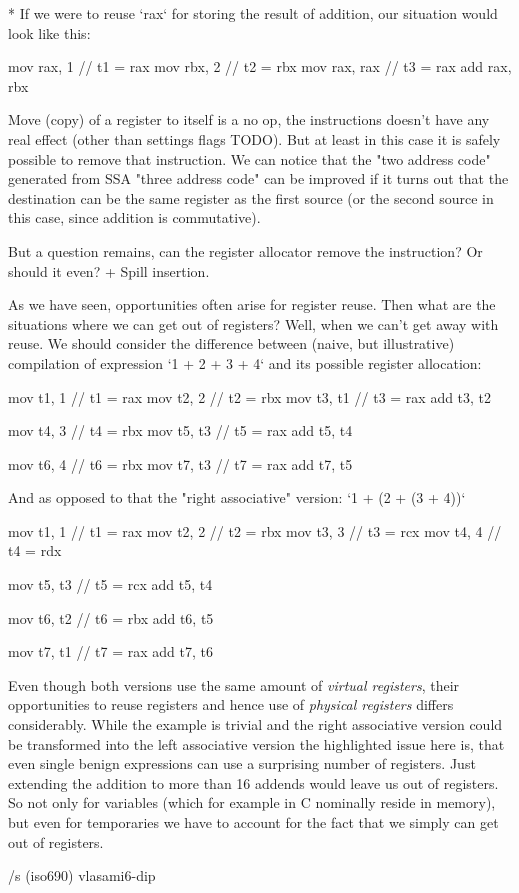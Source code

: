 * If we were to reuse `rax` for storing the result of addition, our situation
would look like this:

\begtt
mov rax, 1   // t1 = rax
mov rbx, 2   // t2 = rbx
mov rax, rax // t3 = rax
add rax, rbx
\endtt

Move (copy) of a register to itself is a no op, the instructions doesn't have
any real effect (other than settings flags TODO). But at least in this case it
is safely possible to remove that instruction. We can notice that the "two
address code" generated from SSA "three address code" can be improved if it
turns out that the destination can be the same register as the first source (or
the second source in this case, since addition is commutative).

But a question remains, can the register allocator remove the instruction?
Or should it even? + Spill insertion.
\enditems

As we have seen, opportunities often arise for register reuse. Then what are the
situations where we can get out of registers? Well, when we can't get away with
reuse. We should consider the difference between (naive, but illustrative)
compilation of expression `1 + 2 + 3 + 4` and its possible register allocation:

\begtt
mov t1, 1  // t1 = rax
mov t2, 2  // t2 = rbx
mov t3, t1 // t3 = rax
add t3, t2

mov t4, 3  // t4 = rbx
mov t5, t3 // t5 = rax
add t5, t4

mov t6, 4  // t6 = rbx
mov t7, t3 // t7 = rax
add t7, t5
\endtt

And as opposed to that the "right associative" version: `1 + (2 + (3 + 4))`

\begtt
mov t1, 1  // t1 = rax
mov t2, 2  // t2 = rbx
mov t3, 3  // t3 = rcx
mov t4, 4  // t4 = rdx

mov t5, t3 // t5 = rcx
add t5, t4

mov t6, t2 // t6 = rbx
add t6, t5

mov t7, t1 // t7 = rax
add t7, t6
\endtt

Even though both versions use the same amount of {\em virtual registers}, their
opportunities to reuse registers and hence use of {\em physical registers}
differs considerably. While the example is trivial and the right associative
version could be transformed into the left associative version the highlighted
issue here is, that even single benign expressions can use a surprising number of
registers. Just extending the addition to more than 16 addends would leave us
out of registers. So not only for variables (which for example in C nominally
reside in memory), but even for temporaries we have to account for the fact that
we simply can get out of registers.

\bibchap
\usebib/s (iso690) vlasami6-dip

\bye
